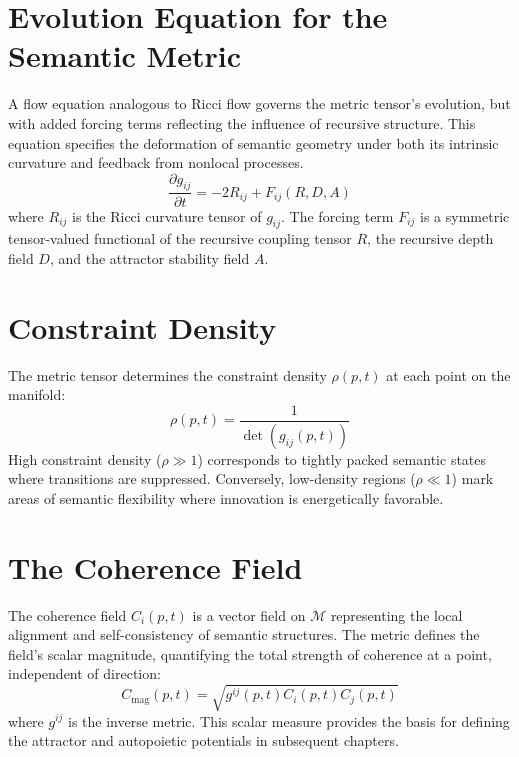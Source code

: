 \section{Evolution Equation for the Semantic Metric}

A flow equation analogous to Ricci flow \autocite{Hamilton1982, Perelman2002} governs the metric tensor's evolution, but with added forcing terms reflecting the influence of recursive structure. This equation specifies the deformation of semantic geometry under both its intrinsic curvature and feedback from nonlocal processes.
\begin{equation}
\frac{\partial g_{ij}}{\partial t} = -2 R_{ij} + F_{ij}(R, D, A)
\end{equation}
where \(R_{ij}\) is the Ricci curvature tensor of \(g_{ij}\). The forcing term \(F_{ij}\) is a symmetric tensor-valued functional of the recursive coupling tensor \(R\), the recursive depth field \(D\), and the attractor stability field \(A\).

\section{Constraint Density}

The metric tensor determines the constraint density \(\rho(p, t)\) at each point on the manifold:
\begin{equation}
\rho(p, t) = \frac{1}{\det(g_{ij}(p, t))}
\end{equation}
High constraint density (\(\rho \gg 1\)) corresponds to tightly packed semantic states where transitions are suppressed. Conversely, low-density regions (\(\rho \ll 1\)) mark areas of semantic flexibility where innovation is energetically favorable.

\section{The Coherence Field}

The coherence field \(C_i(p, t)\) is a vector field on \(\mathcal{M}\) representing the local alignment and self-consistency of semantic structures. The metric defines the field's scalar magnitude, quantifying the total strength of coherence at a point, independent of direction:
\begin{equation}
C_{\mathrm{mag}}(p, t) = \sqrt{g^{ij}(p, t) C_i(p, t) C_j(p, t)}
\end{equation}
where \(g^{ij}\) is the inverse metric. This scalar measure provides the basis for defining the attractor and autopoietic potentials in subsequent chapters.


